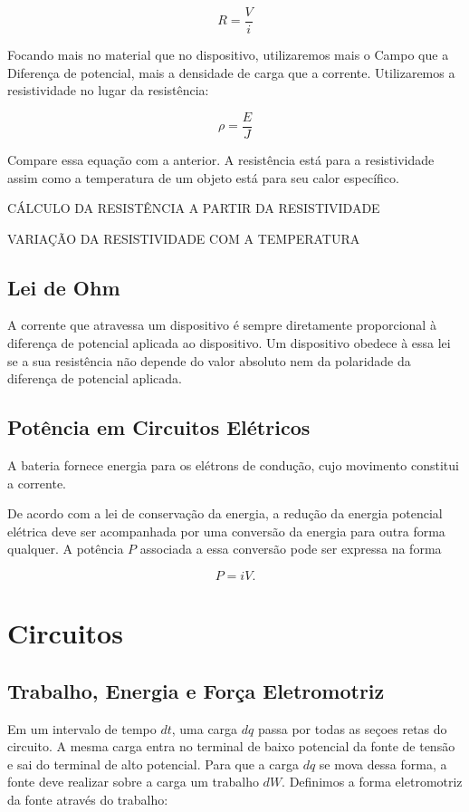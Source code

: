 \begin{equation}
    R=\dfrac{V}{i}
\end{equation}

Focando mais no material que no dispositivo, utilizaremos mais o Campo que a Diferença de potencial, mais a densidade de carga que a corrente. Utilizaremos a resistividade no lugar da resistência:

\begin{equation}
    \rho = \dfrac{E}{J}
\end{equation}

Compare essa equação com a anterior. A resistência está para a resistividade assim como a temperatura de um objeto está para seu calor específico.

CÁLCULO DA RESISTÊNCIA A PARTIR DA RESISTIVIDADE

VARIAÇÃO DA RESISTIVIDADE COM A TEMPERATURA

\subsection{Lei de Ohm}

A corrente que atravessa um dispositivo é sempre diretamente proporcional à diferença de potencial aplicada ao dispositivo. Um dispositivo obedece à essa lei se a sua resistência não depende do valor absoluto nem da polaridade da diferença de potencial aplicada. 


\subsection{Potência em Circuitos Elétricos}

A bateria fornece energia para os elétrons de condução, cujo movimento constitui a corrente.

De acordo com a lei de conservação da energia, a redução da energia potencial elétrica deve ser acompanhada por uma conversão da energia para outra forma qualquer. A potência $P$ associada a essa conversão pode ser expressa na forma

\begin{equation}
P=iV.
\end{equation}

\section{Circuitos}

\subsection{Trabalho, Energia e Força Eletromotriz}
Em um intervalo de tempo $dt$, uma carga $dq$ passa por todas as seçoes retas do circuito. A mesma carga entra no terminal de baixo potencial da fonte de tensão e sai do terminal de alto potencial. Para que a carga $dq$ se mova dessa forma, a fonte deve realizar sobre a carga um trabalho $dW$. Definimos a forma eletromotriz da fonte através do trabalho:

